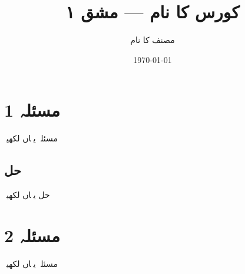 \documentclass[11pt]{article}
\title{کورس کا نام — مشق ١}
\author{مصنف کا نام}
\date{\today}
\begin{document}
\maketitle

\section*{مسئلہ 1}
مسئلہ یہاں لکھیںؔ

\subsection*{حل}
حل یہاں لکھیںؔ

\section*{مسئلہ 2}
مسئلہ یہاں لکھیںؔ
\end{document}
